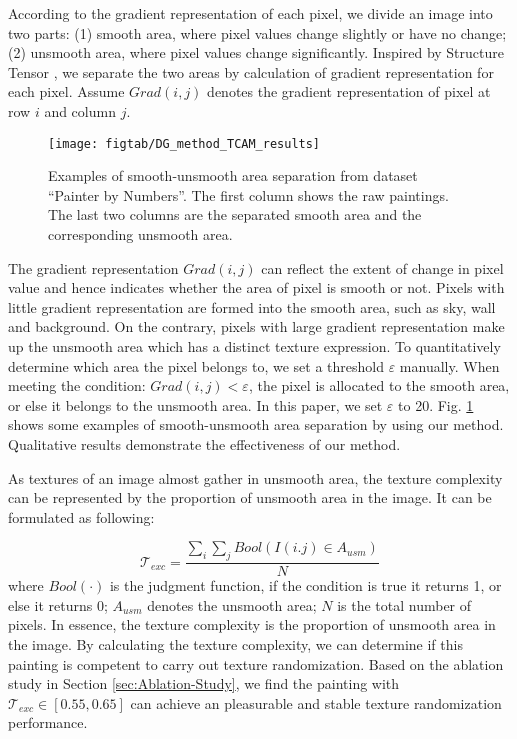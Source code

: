 \documentclass[twocolumn,journal,vlined,ruled,linesnumbered]{IEEEtran}
\begin{document}
According to the gradient representation of each pixel, we divide an image into two parts: (1) smooth area, where pixel values change slightly or have no change; (2) unsmooth area, where pixel values change significantly. Inspired by Structure Tensor \cite{kothe2003edge}, we separate the two areas by calculation of gradient representation for each pixel. Assume $Grad(i,j)$ denotes the gradient representation of pixel at row $i$ and column $j$.

\begin{figure}[t]
\begin{centering}
\texttt{[image: figtab/DG\_method\_TCAM\_results]}
\par\end{centering}
\vspace{-4mm}
\caption{Examples of smooth-unsmooth area separation from dataset ``Painter by Numbers\textquotedblright . The first column shows the raw paintings. The last two columns are the separated smooth area and the corresponding unsmooth area.\label{fig:The-results-of-TCAM}}
\vspace{-5mm}
\end{figure}

The gradient representation $Grad(i,j)$ can reflect the extent of change in pixel value and hence indicates whether the area of pixel is smooth or not. Pixels with little gradient representation are formed into the smooth area, such as sky, wall and background. On the contrary, pixels with large gradient representation make up the unsmooth area which has a distinct texture expression. To quantitatively determine which area the pixel belongs to, we set a threshold $\varepsilon$ manually. When meeting the condition: $Grad(i,j)<\varepsilon$, the pixel is allocated to the smooth area, or else it belongs to the unsmooth area. In this paper, we set $\varepsilon$ to 20. Fig. \ref{fig:The-results-of-TCAM} shows some examples of smooth-unsmooth area separation by using our method. Qualitative results demonstrate the effectiveness of our method.

As textures of an image almost gather in unsmooth area, the texture complexity can be represented by the proportion of unsmooth area in the image. It can be formulated as following:

\vspace{-2mm}

\begin{equation}
\mathcal{T_{\mathit{exc}}}=\frac{\underset{i}{\sum}\underset{j}{\sum}Bool(I(i.j)\in A_{usm})}{N}
\end{equation}
where $Bool(\cdot)$ is the judgment function, if the condition is true it returns 1, or else it returns 0; $A_{usm}$ denotes the unsmooth area; $N$ is the total number of pixels. In essence, the texture complexity is the proportion of unsmooth area in the image. By calculating the texture complexity, we can determine if this painting is competent to carry out texture randomization. Based on the ablation study in Section \ref{sec:Ablation-Study}, we find the painting with $\mathcal{T}_{exc}\in[0.55,0.65]$ can achieve an pleasurable and stable texture randomization performance.
\end{document}
